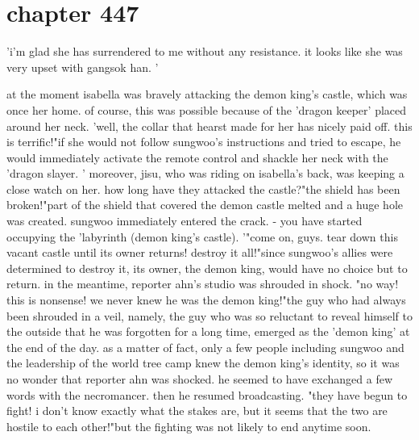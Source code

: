 \section{chapter 447}

'i'm glad she has surrendered to me without any resistance.
 it looks like she was very upset with gangsok han.
'




at the moment isabella was bravely attacking the demon king's castle, which was once her home.
 of course, this was possible because of the 'dragon keeper' placed around her neck.
'well, the collar that hearst made for her has nicely paid off.
 this is terrific!"if she would not follow sungwoo's instructions and tried to escape, he would immediately activate the remote control and shackle her neck with the 'dragon slayer.
' moreover, jisu, who was riding on isabella's back, was keeping a close watch on her.
how long have they attacked the castle?"the shield has been broken!"part of the shield that covered the demon castle melted and a huge hole was created.
 sungwoo immediately entered the crack.
 - you have started occupying the 'labyrinth (demon king's castle).
'"come on, guys.
 tear down this vacant castle until its owner returns! destroy it all!"since sungwoo's allies were determined to destroy it, its owner, the demon king, would have no choice but to return.
 in the meantime, reporter ahn's studio was shrouded in shock.
"no way! this is nonsense! we never knew he was the demon king!"the guy who had always been shrouded in a veil, namely, the guy who was so reluctant to reveal himself to the outside that he was forgotten for a long time, emerged as the 'demon king' at the end of the day.
as a matter of fact, only a few people including sungwoo and the leadership of the world tree camp knew the demon king's identity, so it was no wonder that reporter ahn was shocked.
 he seemed to have exchanged a few words with the necromancer.
then he resumed broadcasting.
 "they have begun to fight! i don't know exactly what the stakes are, but it seems that the two are hostile to each other!"but the fighting was not likely to end anytime soon.
 
